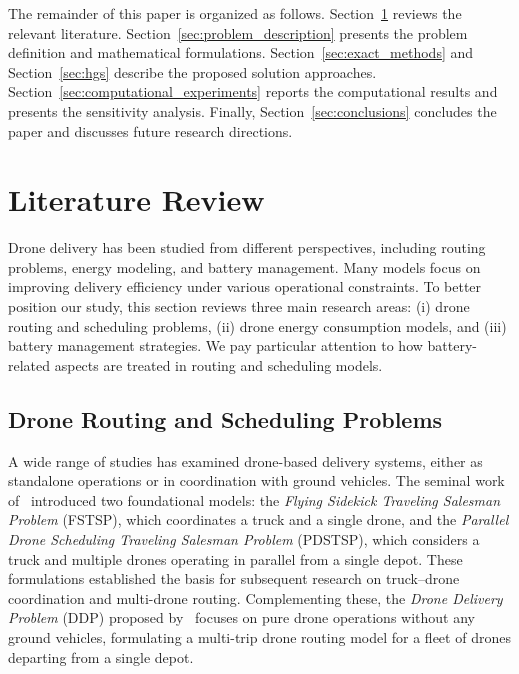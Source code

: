 \documentclass[3p, authoryear, 11pt]{elsarticle}
\begin{document}
The remainder of this paper is organized as follows. 
Section~\ref{sec:literature_review} reviews the relevant literature. 
Section~\ref{sec:problem_description} presents the problem definition and mathematical formulations. Section~\ref{sec:exact_methods} and Section~\ref{sec:hgs} describe the proposed solution approaches. Section~\ref{sec:computational_experiments} reports the computational results and presents the sensitivity analysis. 
Finally, Section~\ref{sec:conclusions} concludes the paper and discusses future research directions.

\section{Literature Review}
\label{sec:literature_review}

Drone delivery has been studied from different perspectives, including routing problems, energy modeling, and battery management. 
Many models focus on improving delivery efficiency under various operational constraints. 
To better position our study, this section reviews three main research areas: 
(i) drone routing and scheduling problems, 
(ii) drone energy consumption models, and 
(iii) battery management strategies. 
We pay particular attention to how battery-related aspects are treated in routing and scheduling models.

\subsection{Drone Routing and Scheduling Problems}

A wide range of studies has examined drone-based delivery systems, either as standalone operations or in coordination with ground vehicles. 
The seminal work of~\citet{murray_flying_2015} introduced two foundational models: the \textit{Flying Sidekick Traveling Salesman Problem} (FSTSP), which coordinates a truck and a single drone, and the \textit{Parallel Drone Scheduling Traveling Salesman Problem} (PDSTSP), which considers a truck and multiple drones operating in parallel from a single depot. These formulations established the basis for subsequent research on truck–drone coordination and multi-drone routing. Complementing these, the \textit{Drone Delivery Problem} (DDP) proposed by~\citet{dorling_vehicle_2017} focuses on pure drone operations without any ground vehicles, formulating a multi-trip drone routing model for a fleet of drones departing from a single depot.
\end{document}
